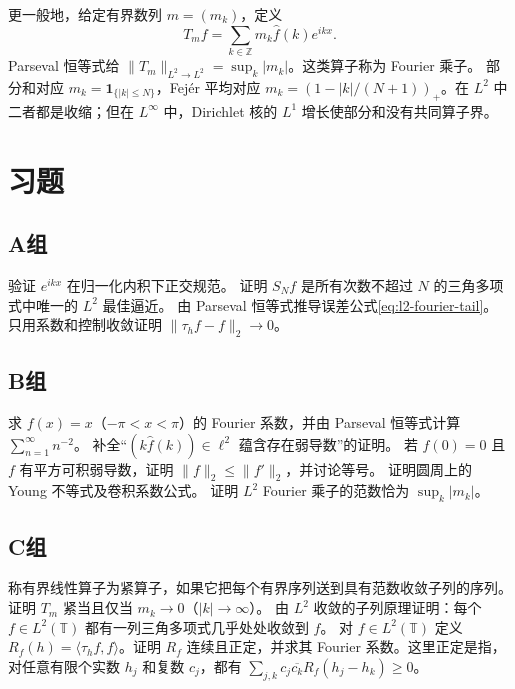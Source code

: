 更一般地，给定有界数列 \(m=(m_k)\)，定义
\[
 T_mf=\sum_{k\in\mathbb Z}m_k\widehat f(k)e^{ikx}.
\]
Parseval 恒等式给
\(\|T_m\|_{L^2\to L^2}=\sup_k|m_k|\)。这类算子称为 Fourier 乘子。
部分和对应 \(m_k=\mathbf1_{\{|k|\le N\}}\)，Fejér 平均对应
\(m_k=(1-|k|/(N+1))_+\)。在 \(L^2\) 中二者都是收缩；但在
\(L^\infty\) 中，Dirichlet 核的 \(L^1\) 增长使部分和没有共同算子界。

\section*{习题}
\subsection*{A组}
\begin{enumerate}[label=\textbf{\thechapter.\arabic*.}]
验证 \(e^{ikx}\) 在归一化内积下正交规范。
证明 \(S_Nf\) 是所有次数不超过 \(N\) 的三角多项式中唯一的 \(L^2\) 最佳逼近。
由 Parseval 恒等式推导误差公式\eqref{eq:l2-fourier-tail}。
只用系数和控制收敛证明 \(\|\tau_hf-f\|_2\to0\)。
\end{enumerate}
\subsection*{B组}
\begin{enumerate}[label=\textbf{\thechapter.\arabic*.},resume]
求 \(f(x)=x\)（\(-\pi<x<\pi\)）的 Fourier 系数，并由 Parseval 恒等式计算 \(\sum_{n=1}^\infty n^{-2}\)。
补全“\((k\widehat f(k))\in\ell^2\) 蕴含存在弱导数”的证明。
若 \(\widehat f(0)=0\) 且 \(f\) 有平方可积弱导数，证明 \(\|f\|_2\le\|f'\|_2\)，并讨论等号。
证明圆周上的 Young 不等式及卷积系数公式。
证明 \(L^2\) Fourier 乘子的范数恰为 \(\sup_k|m_k|\)。
\end{enumerate}
\subsection*{C组}
\begin{enumerate}[label=\textbf{\thechapter.\arabic*.},resume]
称有界线性算子为紧算子，如果它把每个有界序列送到具有范数收敛子列的序列。证明 \(T_m\) 紧当且仅当 \(m_k\to0\)（\(|k|\to\infty\)）。
由 \(L^2\) 收敛的子列原理证明：每个 \(f\in L^2(\mathbb T)\) 都有一列三角多项式几乎处处收敛到 \(f\)。
对 \(f\in L^2(\mathbb T)\) 定义 \(R_f(h)=\langle \tau_hf,f\rangle\)。证明 \(R_f\) 连续且正定，并求其 Fourier 系数。这里正定是指，对任意有限个实数 \(h_j\) 和复数 \(c_j\)，都有 \(\sum_{j,k}c_j\overline{c_k}R_f(h_j-h_k)\ge0\)。
\end{enumerate}
